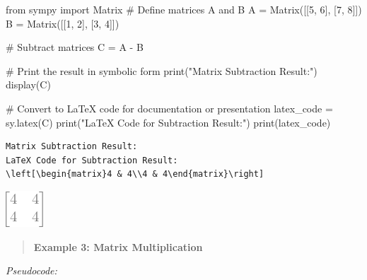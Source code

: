 \documentclass[
  letterpaper,
  DIV=11,
  numbers=noendperiod]{scrreprt}
\newenvironment{Shaded}{\begin{snugshade}}{\end{snugshade}}
\newcommand{\BuiltInTok}[1]{\textcolor[rgb]{0.00,0.23,0.31}{#1}}
\newcommand{\CommentTok}[1]{\textcolor[rgb]{0.37,0.37,0.37}{#1}}
\newcommand{\DecValTok}[1]{\textcolor[rgb]{0.68,0.00,0.00}{#1}}
\newcommand{\ImportTok}[1]{\textcolor[rgb]{0.00,0.46,0.62}{#1}}
\newcommand{\NormalTok}[1]{\textcolor[rgb]{0.00,0.23,0.31}{#1}}
\newcommand{\OperatorTok}[1]{\textcolor[rgb]{0.37,0.37,0.37}{#1}}
\newcommand{\StringTok}[1]{\textcolor[rgb]{0.13,0.47,0.30}{#1}}
\theoremstyle{plain}
\theoremstyle{definition}
\theoremstyle{remark}
\begin{document}
\begin{Shaded}
\begin{Highlighting}[]
\ImportTok{from}\NormalTok{ sympy }\ImportTok{import}\NormalTok{ Matrix}
\CommentTok{\# Define matrices A and B}
\NormalTok{A }\OperatorTok{=}\NormalTok{ Matrix([[}\DecValTok{5}\NormalTok{, }\DecValTok{6}\NormalTok{], [}\DecValTok{7}\NormalTok{, }\DecValTok{8}\NormalTok{]])}
\NormalTok{B }\OperatorTok{=}\NormalTok{ Matrix([[}\DecValTok{1}\NormalTok{, }\DecValTok{2}\NormalTok{], [}\DecValTok{3}\NormalTok{, }\DecValTok{4}\NormalTok{]])}

\CommentTok{\# Subtract matrices}
\NormalTok{C }\OperatorTok{=}\NormalTok{ A }\OperatorTok{{-}}\NormalTok{ B}

\CommentTok{\# Print the result in symbolic form}
\BuiltInTok{print}\NormalTok{(}\StringTok{"Matrix Subtraction Result:"}\NormalTok{)}
\NormalTok{display(C)}

\CommentTok{\# Convert to LaTeX code for documentation or presentation}
\NormalTok{latex\_code }\OperatorTok{=}\NormalTok{ sy.latex(C)}
\BuiltInTok{print}\NormalTok{(}\StringTok{"LaTeX Code for Subtraction Result:"}\NormalTok{)}
\BuiltInTok{print}\NormalTok{(latex\_code)}
\end{Highlighting}
\end{Shaded}

\begin{verbatim}
Matrix Subtraction Result:
LaTeX Code for Subtraction Result:
\left[\begin{matrix}4 & 4\\4 & 4\end{matrix}\right]
\end{verbatim}

\includegraphics{module_1_files/figure-pdf/cell-4-output-2.png}

\begin{quote}
\textbf{Example 3: Matrix Multiplication}
\end{quote}

\emph{Pseudocode:}
\end{document}
